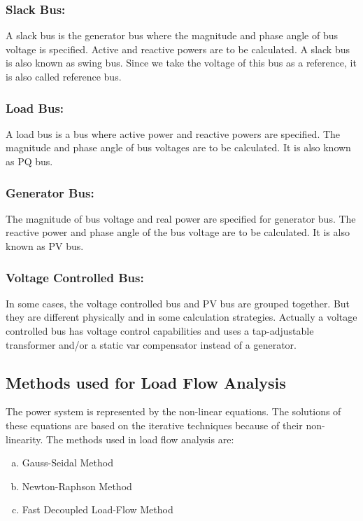 \documentclass[a4paper,11pt]{article}
\begin{document}
\subsubsection{Slack Bus:}

A slack bus is the generator bus where the magnitude and phase angle of bus voltage is specified. Active and reactive powers are to be calculated. A slack bus is also known as swing bus. Since we take the voltage of this bus as a reference, it is also called reference bus. 

\subsubsection{Load Bus:}

A load bus is a bus where active power and reactive powers are specified. The magnitude and phase angle of bus voltages are to be calculated. It is also known as PQ bus.

\subsubsection{Generator Bus:}

The magnitude of bus voltage and real power are specified for generator bus. The reactive power and phase angle of the bus voltage are to be calculated. It is also known as PV bus.

\subsubsection{Voltage Controlled Bus:}

In some cases, the voltage controlled bus and PV bus are grouped together. But they are different physically and in some calculation strategies. Actually a voltage controlled bus has voltage control capabilities and uses a tap-adjustable transformer and/or a static var compensator instead of a generator.

\subsection{Methods used for Load Flow Analysis}

The power system is represented by the non-linear equations. The solutions of these equations are based on the iterative techniques because of their non-linearity. The methods used in load flow analysis are:

\begin{enumerate}[a.]
\item Gauss-Seidal Method
\item Newton-Raphson Method
\item Fast Decoupled Load-Flow Method
\end{enumerate}
\end{document}
